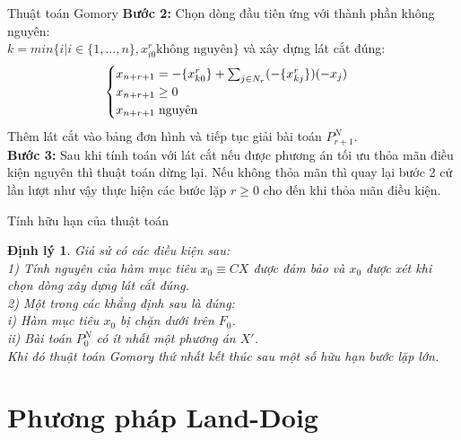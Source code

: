 \documentclass[10pt]{beamer}
\newtheorem{dl}{Định lý}[section]
\begin{document}
    \begin{frame}{Thuật toán Gomory}
     \textbf{Bước 2:}
Chọn dòng đầu tiên ứng với thành phần không nguyên:\\
$k=min\{i|i\in \{1,...,n\},x_{i0}^r \text{không nguyên}\}$ và xây dựng lát cắt đúng:\\
$$   \begin{cases}\label{latcat}
    x_{n+r+1}= -\{x_{k0}^r\} + \sum_{j\in N_r}(-\{x_{kj}^r\} )(-x_j)\\
    x_{n+r+1} \ge 0\\
    x_{n+r+1} \hspace{0.1cm} \text{nguyên}
\end{cases}$$
Thêm lát cắt vào bảng đơn hình và tiếp tục giải bài toán $P^N_{r+1}$.\\
        \textbf{Bước 3:}
Sau khi tính toán với lát cắt nếu được phương án tối ưu thỏa mãn điều kiện nguyên thì thuật toán dừng lại. Nếu không thỏa mãn thì quay lại bước 2 cứ lần lượt như vậy thực hiện các bước lặp $r \ge 0$ cho đến khi thỏa mãn điều kiện.\\

    \end{frame}

     \begin{frame}{Tính hữu hạn của thuật toán}
         \begin{dl}
Giả sử có các điều kiện sau:\\
1) Tính nguyên của hàm mục tiêu $x_0\equiv CX$ được đảm bảo và $x_0$ được xét khi chọn dòng xây dựng lát cắt đúng.\\
2) Một trong các khẳng định sau là đúng:\\
i) Hàm mục tiêu $x_0$ bị chặn dưới trên $F_0$.\\ 
ii) Bài toán $P^N_0$ có ít nhất một phương án $X'$.\\
 Khi đó thuật toán Gomory thứ nhất kết thúc sau một số hữu hạn bước lặp lớn.
 \end{dl}
\end{frame}









\section{Phương pháp Land-Doig}
\end{document}
